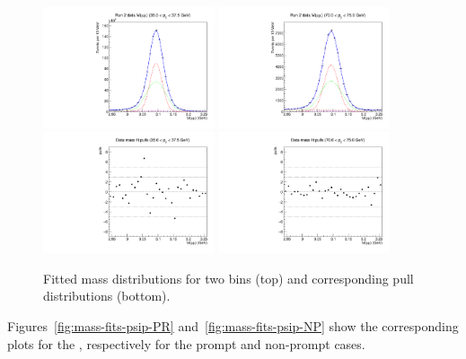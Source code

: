 \begin{figure}[h]
\centering
\includegraphics[width=0.45\textwidth]{Figures/chapter4/Mfit_pt4.pdf}
\includegraphics[width=0.45\textwidth]{Figures/chapter4/Mfit_pt14.pdf}\\
\includegraphics[width=0.45\textwidth]{Figures/chapter4/Mpulls_pt4.pdf}
\includegraphics[width=0.45\textwidth]{Figures/chapter4/Mpulls_pt14.pdf}
\caption{Fitted \jpsi mass distributions for two \pt bins (top) 
and corresponding pull distributions (bottom).}
\label{fig:mass-fits-psi}
\end{figure}

\vfill\newpage

Figures~\ref{fig:mass-fits-psip-PR} and~\ref{fig:mass-fits-psip-NP} show
the corresponding plots for the \psip, respectively for the prompt and non-prompt cases.

